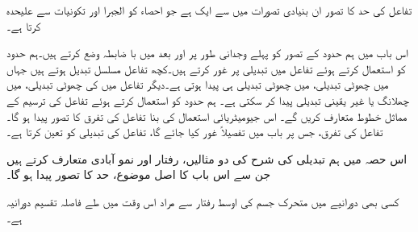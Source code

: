 تفاعل کی حد کا تصور ان بنیادی تصورات میں سے ایک ہے جو احصاء کو الجبرا اور تکونیات سے علیحدہ کرتا ہے۔

اس باب میں ہم حدود کے تصور کو پہلے وجدانی طور پر اور بعد میں با ضابطہ وضع کرتے ہیں۔ہم حدود کو استعمال کرتے ہوئے تفاعل  میں تبدیلی پر غور کرتے ہیں۔کچھ تفاعل مسلسل تبدیل ہوتے ہیں جہاں  میں چھوٹی تبدیلی،  میں چھوٹی تبدیلی ہی پیدا ہوتی ہے۔دیگر تفاعل میں  کی چھوٹی تبدیلی،  میں چھلانگ یا غیر یقینی تبدیلی  پیدا کر سکتی ہے۔ ہم حدود کو استعمال کرتے ہوئے تفاعل کی ترسیم کے مماثل خطوط متعارف کریں گے۔ اس جیومیٹریائی استعمال کی بنا تفاعل کی تفرق کا تصور پیدا ہو گا۔تفاعل کی تفرق، جس پر  باب  میں تفصیلاً غور کیا جائے گا، تفاعل کی تبدیلی کو تعین کرتا ہے۔

اس حصہ میں ہم تبدیلی کی شرح کی دو مثالیں، رفتار اور نمو آبادی متعارف کرتے ہیں جن سے اس باب کا اصل موضوع، حد کا تصور پیدا ہو گا۔

کسی بھی دورانیے میں متحرک جسم کی اوسط رفتار سے مراد اس وقت میں طے فاصلہ تقسیم دورانیہ ہے۔

